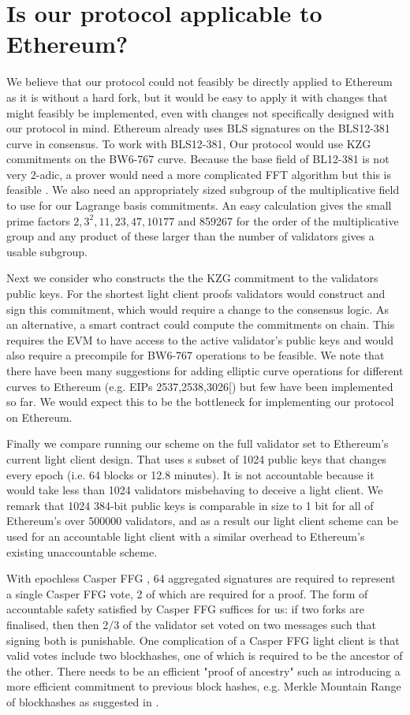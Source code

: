 \section{Is our protocol applicable to Ethereum?} \label{sec:ethereum}

We believe that our protocol could not feasibly be directly applied to Ethereum as it is without a hard fork, but it would be easy to apply it with changes that might feasibly be implemented, even with changes not specifically designed with our protocol in mind.
 Ethereum already uses BLS signatures on the BLS12-381 curve in consensus. To work with BLS12-381, Our protocol would use KZG commitments on the BW6-767 curve\cite{bw6767}.
 Because the base field of BL12-381 is not very 2-adic, a prover would need a more complicated FFT algorithm but this is feasible \cite{bw6767}. We also need an appropriately sized subgroup of the multiplicative field to use for our Lagrange basis commitments. An easy calculation gives the small prime factors $2,3^2,11,23,47,10177$ and 859267 for the order of the multiplicative group and any product of these larger than the number of validators gives a usable subgroup.
 
 Next we consider who constructs the the KZG commitment to the validators public keys. For the shortest light client proofs validators would construct and sign this commitment, which would require a change to the consensus logic. As an alternative, a smart contract could compute the commitments on chain.
 This requires the EVM to have access to the active validator's public keys and would also require a precompile for BW6-767 operations to be feasible.
 We note that there have been many suggestions for adding elliptic curve operations for different curves to Ethereum (e.g. EIPs 2537,2538,3026[\cite{EIPs}) but few have been implemented so far.
 We would expect this to be the bottleneck for implementing our protocol on Ethereum.
 
 Finally we compare running our scheme on the full validator set to Ethereum's current light client design\cite{ethlight}.
 That uses s subset of 1024 public keys that changes every epoch (i.e. 64 blocks or 12.8 minutes). It is not accountable because it would take less than 1024 validators misbehaving to deceive a light client. We remark that 1024 384-bit public keys is comparable in size to 1 bit for all of Ethereum's over 500000 validators, and as a result our light client scheme can be used for an accountable light client with a similar overhead to Ethereum's existing unaccountable scheme.

 With epochless Casper FFG \cite{Gasper}, 64 aggregated signatures are required to represent a single Casper FFG vote, 2 of which are required for a proof. The form of accountable safety satisfied by Casper FFG \cite{CasperFFG} suffices for us: if two forks are finalised, then then 2/3 of the validator set voted on two messages such that signing both is punishable.  One complication of a Casper FFG light client is that valid votes include two blockhashes, one of which is required to be the ancestor of the other. There needs to be an efficient "proof of ancestry" such as introducing a more efficient commitment to previous block hashes, e.g. Merkle Mountain Range of blockhashes as suggested in \cite{flyclient}.
